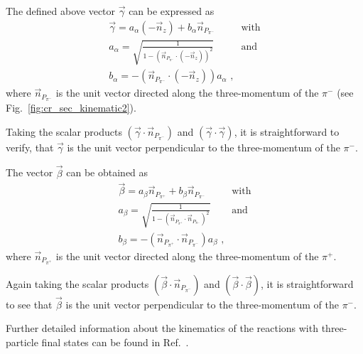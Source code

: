 \documentclass[prc,twocolumn,superscriptaddress,showpacs,amssymb,amsmath,amsfonts,aps,nofootinbib]{revtex4-1}
\begin{document}
The defined above vector $\vec \gamma$ can be expressed as
\begin{eqnarray}
\vec \gamma = a_{\alpha}(-\vec n_{z}) + b_{\alpha}\vec n_{P_{\pi^{-}}} & \text{with} \nonumber \\
a_{\alpha} = \sqrt{\frac{1}{1 - (\vec n_{P_{\pi^{-}}} \cdot (-\vec n_{z} ) )^{2}}} & \text{and} \label{alphavec}\\
b_{\alpha} = - (\vec n_{P_{\pi^{-}}} \cdot (-\vec n_{z} ) ) a_{\alpha} \textrm{ ,} \nonumber
\end{eqnarray} 
where $\vec n_{P_{\pi^{-}}}$ is the unit vector directed along the three-momentum of the $\pi^{-}$ (see Fig.~\ref{fig:cr_sec_kinematic2}).

Taking the scalar products $(\vec \gamma \cdot \vec
n_{P_{\pi^{-}}})$ and $(\vec \gamma \cdot \vec  \gamma)$,
it is straightforward to verify, that $\vec \gamma$ is the unit vector perpendicular to the three-momentum of the $\pi^{-}$.

The vector $\vec \beta$ can be obtained as
\begin{eqnarray}
\vec \beta = a_{\beta}\vec n_{P_{\pi^{+}}} + b_{\beta}\vec n_{P_{\pi^{-}}} & \text{with} \nonumber \\
a_{\beta} = \sqrt{\frac{1}{1 - (\vec n_{P_{\pi^{+}}} \cdot \vec n_{P_{\pi^{-}}})^{2}}} & \text{and} \label{betavec}\\
b_{\beta} = - (\vec n_{P_{\pi^{+}}} \cdot \vec n_{P_{\pi^{-}}}) a_{\beta} \textrm{ ,} \nonumber
\end{eqnarray} 
where $\vec n_{P_{\pi^{+}}}$ is the unit vector directed along the three-momentum of the $\pi^{+}$.

Again taking the scalar products $(\vec \beta \cdot \vec
n_{P_{\pi^{-}}})$ and $(\vec \beta \cdot \vec  \beta)$,
it is straightforward to see that $\vec \beta$ is
the unit vector perpendicular to the 
three-momentum of the $\pi^{-}$. 






Further detailed information about the kinematics of the reactions with three-particle final states can be found in Ref.~\cite{Byckling:1971vca}.



{}

%
\end{document}
